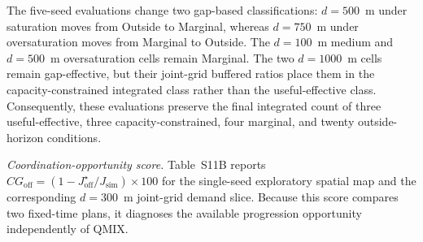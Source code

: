\documentclass[12pt]{article}
\begin{document}
\begin{table}[H]
\centering
\caption*{\textbf{Table S11A:} Five-seed paired validation of selected
boundary-adjacent cells in the exploratory joint distance--demand grid.
Offset and QMIX waiting values are five-seed means. The confidence interval
is the paired bootstrap 95\% interval for the QMIX approximation gap.
Regime stability is the percentage of seeds reproducing the regime assigned
from the five-seed mean gap.}
\small
\setlength{\tabcolsep}{3.5pt}
\end{table}

The five-seed evaluations change two gap-based classifications:
$d=500$~m under saturation moves from Outside to Marginal, whereas
$d=750$~m under oversaturation moves from Marginal to Outside.
The $d=100$~m medium and $d=500$~m oversaturation cells remain
Marginal. The two $d=1000$~m cells remain gap-effective, but their
joint-grid buffered ratios place them in the capacity-constrained
integrated class rather than the useful-effective class. Consequently,
these evaluations preserve the final integrated count of three useful-effective,
three capacity-constrained, four marginal, and twenty outside-horizon
conditions.

\textit{Coordination-opportunity score.}
Table~S11B reports $CG_{\mathrm{off}}=(1-J_{\mathrm{off}}^\star/J_{\mathrm{sim}})\times100$ for the single-seed exploratory spatial map and the corresponding $d=300$~m joint-grid demand slice. Because this score compares two fixed-time plans, it diagnoses the available progression opportunity independently of QMIX.
\end{document}
